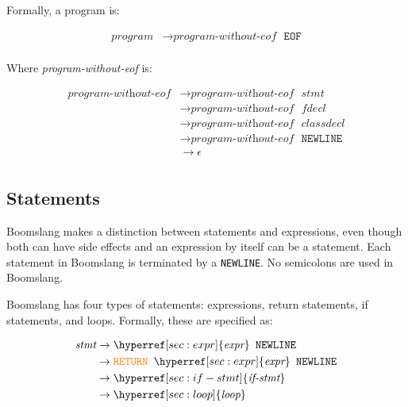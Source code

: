 \documentclass{article}
\begin{document}
Formally, a program is:

\label{sec:program}
\begin{align*}
    \textit{program} &\to \hyperref[sec:program-without-eof]{\textit{program-without-eof}} \texttt{ } \texttt{EOF} \\
\end{align*}

Where \textit{program-without-eof} is:

\label{sec:program-without-eof}
\begin{align*}
    \textit{program-without-eof} &\to \hyperref[sec:program-without-eof]{\textit{program-without-eof}} \texttt{ } \hyperref[sec:stmt]{\textit{stmt}} \\
    &\to \hyperref[sec:program-without-eof]{\textit{program-without-eof}} \texttt{ } \hyperref[sec:fdecl]{\textit{fdecl}} \\
    &\to \hyperref[sec:program-without-eof]{\textit{program-without-eof}} \texttt{ } \hyperref[sec:classdecl]{\textit{classdecl}} \\
    &\to \hyperref[sec:program-without-eof]{\textit{program-without-eof}} \texttt{ } \texttt{NEWLINE} \\
    &\to \epsilon \\
\end{align*}

\subsection{Statements}
Boomslang makes a distinction between statements and expressions, even though both can have side effects and an expression by itself can be a statement. Each statement in Boomslang is terminated by a \texttt{NEWLINE}. No semicolons are used in Boomslang.

Boomslang has four types of statements: expressions, return statements, if statements, and loops. Formally, these are specified as:

\label{sec:stmt}
\begin{align*}
    \textit{stmt} &\to \hyperref[sec:expr]{\textit{expr}} \texttt{ } \texttt{NEWLINE} \\
    &\to \textcolor{orange}{\texttt{RETURN}} \texttt{ } \hyperref[sec:expr]{\textit{expr}} \texttt{ } \texttt{NEWLINE} \\
    &\to \hyperref[sec:if-stmt]{\textit{if-stmt}} \\
    &\to \hyperref[sec:loop]{\textit{loop}} \\
\end{align*}
\end{document}
